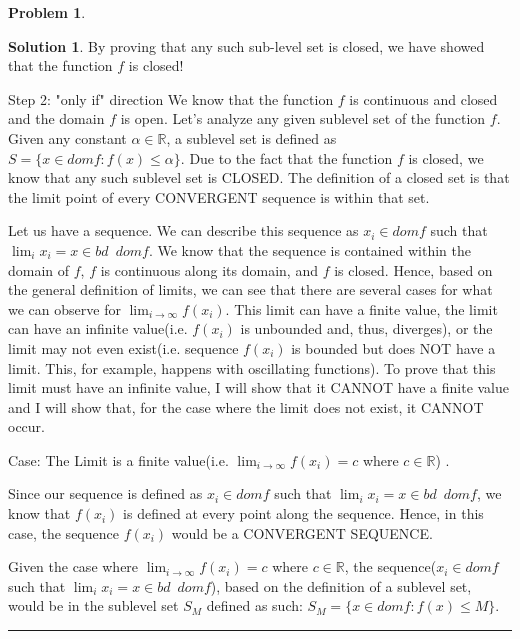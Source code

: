 \documentclass{article}
\theoremstyle{definition}
\newtheorem{problem}{Problem}
\def\fline{\rule{0.75\linewidth}{0.5pt}}
\newcommand{\finishline}{\begin{center}\fline\end{center}}
\newtheorem*{solution*}{Solution}
\newenvironment{solution}{\begin{solution*}}{{\finishline} \end{solution*}}
\begin{document}
\begin{problem}
\begin{solution}
By proving that any such sub-level set is closed, we have showed that the function $f$ is closed! \newline 




Step 2: "only if" direction \newline 
We know that the function $f$ is continuous and closed and the domain $f$ is open. Let's analyze any given sublevel set of the function $f$. Given any constant $\alpha \in \mathbb{R}$, a sublevel set is defined as $S = \{x \in dom f : f(x) \leq \alpha \}$. Due to the fact that the function $f$ is closed, we know that any such sublevel set is CLOSED. The definition of a closed set is that the limit point of every CONVERGENT sequence is within that set. 

Let us have a sequence. We can describe this sequence as $x_i \in dom f$ such that $\lim_{i} x_i = x \in bd \enspace dom f$. We know that the sequence is contained within the domain of $f$, $f$ is continuous along its domain, and $f$ is closed. Hence, based on the general definition of limits, we can see that there are several cases for what we can observe for $\lim_{i\to\infty} f(x_i)$. This limit can have a finite value, the limit can have an infinite value(i.e. $f(x_i)$ is unbounded and, thus, diverges), or the limit may not even exist(i.e. sequence $f(x_i)$ is bounded but does NOT have a limit. This, for example, happens with oscillating functions). To prove that this limit must have an infinite value, I will show that it CANNOT have a finite value and I will show that, for the case where the limit does not exist, it CANNOT occur. \newline 

Case: The Limit is a finite value(i.e. $\lim_{i\to\infty} f(x_i) = c$ where $c \in \mathbb{R}$) . \newline 

Since our sequence is defined as $x_i \in dom f$ such that $\lim_{i} x_i = x \in bd \enspace dom f$, we know that $f(x_i)$ is defined at every point along the sequence.  Hence, in this case, the sequence $f(x_i)$ would be a CONVERGENT SEQUENCE. \newline 

Given the case where $\lim_{i\to\infty} f(x_i) = c$ where $c \in \mathbb{R}$, the sequence($x_i \in dom f$ such that $\lim_{i} x_i = x \in bd \enspace dom f$), based on the definition of a sublevel set, would be in the sublevel set $S_M$ defined as such: $S_M = \{x \in dom f : f(x) \leq M \}$. \newline 


\end{solution}
\end{problem}
\end{document}

